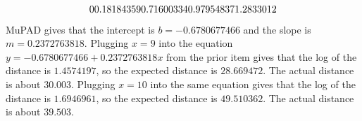 \begin{exercises}
\begin{answer}
\begin{exparts}
\begin{equation*}
{                           0 \\
                           0.18184359 \\
                           0.71600334 \\
                           0.97954837 \\
                           1.2833012}
            \end{equation*}
            MuPAD gives that the intercept is $b= -0.6780677466$ and
            the slope is $m=0.2372763818$.
          \partsitem Plugging $x=9$ into the equation
            $y= -0.6780677466+0.2372763818x$ from the prior item gives
            that the log of the distance is $1.4574197$, so the expected
            distance is $28.669472$.
            The actual distance is about $30.003$.
          \partsitem Plugging $x=10$ into the same equation
            gives that the log of the distance is $1.6946961$, so the expected
            distance is $49.510362$.
            The actual distance is about $39.503$.
        \end{exparts}
      \end{answer}

\end{exercises}
